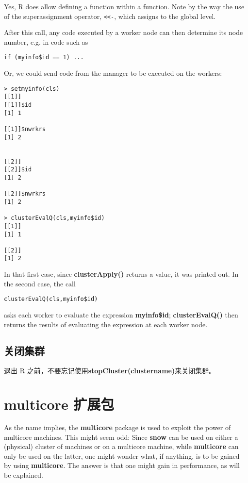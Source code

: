 Yes, R does allow defining a function within a function.  Note by the
way the use of the superassignment operator, \verb#<<-#, which assigns
to the global level.

After this call, any code executed by a worker node can then determine
its node number, e.g. in code such as

\begin{lstlisting}
if (myinfo$id == 1) ...
\end{lstlisting}

Or, we could send code from the manager to be executed on the workers:

\begin{lstlisting}
> setmyinfo(cls)
[[1]]
[[1]]$id
[1] 1

[[1]]$nwrkrs
[1] 2


[[2]]
[[2]]$id
[1] 2

[[2]]$nwrkrs
[1] 2

> clusterEvalQ(cls,myinfo$id)
[[1]]
[1] 1

[[2]]
[1] 2
\end{lstlisting}

In that first case, since {\bf clusterApply()} returns a value, it was
printed out.  In the second case, the call

\begin{lstlisting}
clusterEvalQ(cls,myinfo$id)
\end{lstlisting}

asks each worker to evaluate the expression \textbf{myinfo\$id};
{\bf clusterEvalQ()} then returns the results of evaluating the
expression at each worker node.

\subsection{关闭集群}

退出 R 之前，不要忘记使用{\bf stopCluster(clustername)}来关闭集群。

\section{multicore 扩展包}

As the name implies, the {\bf multicore} package is used to exploit the
power of multicore machines.  This might seem odd: Since {\bf snow} can
be used on either a (physical) cluster of machines or on a multicore
machine, while {\bf multicore} can only be used on the latter, one might
wonder what, if anything, is to be gained by using {\bf multicore}.  The
answer is that one might gain in performance, as will be explained.

